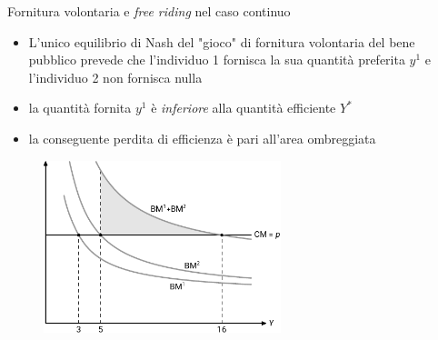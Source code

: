 \documentclass[aspectratio=64,11pt]{beamer}
\begin{document}
\begin{frame}{Fornitura volontaria e \emph{free riding} nel caso continuo}
\begin{itemize}
\item L'unico equilibrio di Nash del "gioco" di fornitura volontaria del bene
pubblico prevede che l'individuo 1 fornisca la sua quantità preferita
$y^{1}$ e l'individuo 2 non fornisca nulla
\item la quantità fornita $y^{1}$ è \emph{inferiore} alla quantità efficiente $Y^{*}$
\item la conseguente perdita di efficienza è pari all'area ombreggiata
\end{itemize}

\begin{figure}[htbp]
\centering
\includegraphics[height=5cm]{./figure/bene-pubblico-equilibrio.pdf}
\end{figure} 
\end{frame}
\end{document}
